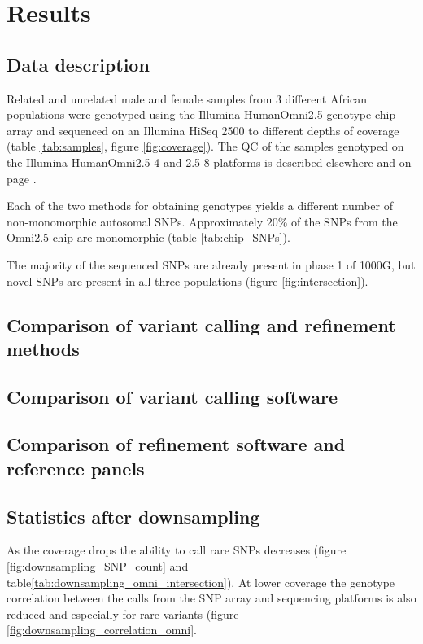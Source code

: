 \section{Results}

\subsection{Data description}
\label{sec:agv_data_description}
Related and unrelated male and female samples from 3 different African populations were genotyped using the Illumina HumanOmni2.5 genotype chip array and sequenced on an Illumina HiSeq 2500 to different depths of coverage (table \ref{tab:samples}, figure \ref{fig:coverage}). The \gls{QC} of the samples genotyped on the Illumina HumanOmni2.5-4 and 2.5-8 platforms is described elsewhere\cite{Gurdasani2015} and on page \pageref{subsec:chipQC}.

Each of the two methods for obtaining genotypes yields a different number of non-monomorphic autosomal SNPs. Approximately 20\% of the SNPs from the Omni2.5 chip are monomorphic (table \ref{tab:chip_SNPs}).

The majority of the sequenced \glspl{SNP} are already present in phase 1 of \gls{1000G}\cite{1000G2012}, but novel SNPs are present in all three populations (figure \ref{fig:intersection}).

\subsection{Comparison of variant calling and refinement methods}
\subsection{Comparison of variant calling software}
\subsection{Comparison of refinement software and reference panels}

\subsection{Statistics after downsampling}

As the coverage drops the ability to call rare \glspl{SNP} decreases (figure \ref{fig:downsampling_SNP_count} and table\ref{tab:downsampling_omni_intersection}). At lower coverage the genotype correlation between the calls from the SNP array and sequencing platforms is also reduced and especially for rare variants (figure \ref{fig:downsampling_correlation_omni}.

